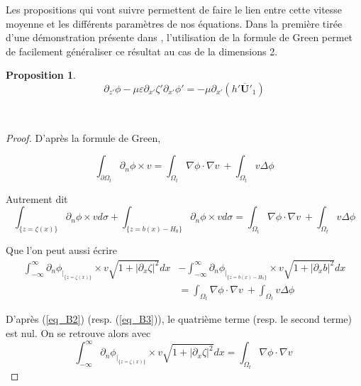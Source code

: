 \documentclass[12pt,a4paper]{article}
\newtheorem{prop}[dfn]{\textbf{Proposition}}
\numberwithin{equation}{section}
\begin{document}
Les propositions qui vont suivre permettent de faire le lien entre cette vitesse moyenne et les différents paramètres de nos équations. Dans la première tirée d'une démonstration présente dans \cite{Lannes}, l'utilisation de la formule de Green permet de facilement généraliser ce résultat au cas de la dimensions 2.
\begin{prop} \label{prop:meanspeed_to_eq4}
    $$\partial_{z'}\phi - \mu\varepsilon\partial_{x'}\zeta'\partial_{x'}\phi' = -\mu \partial_{x'}\left(h'\overline{\textbf{U}}'_1 \right)$$
\end{prop}
\,\\
\begin{proof}
    D'après la formule de Green, 

    \begin{equation}
        \int_{\partial\Omega_t}{\partial_n\phi \times v} = \int_{\Omega_t}{\nabla\phi \cdot \nabla v}~ + \int_{\Omega_t}{v\Delta \phi}
    \end{equation}

    Autrement dit
    \begin{equation}
        \int_{\{z = \zeta(x)\}}\partial_n\phi \times vd\sigma + \int_{\{z = b(x) - H_0\}}{\partial_n\phi \times v}d\sigma = \int_{\Omega_t}{\nabla\phi \cdot \nabla v}~+ \int_{\Omega_t}{v\Delta \phi}
    \end{equation}

    Que l'on peut aussi écrire
    \begin{equation}
    \begin{split}
        \int_{-\infty}^\infty\partial_n\phi_{|_{\{z = \zeta(x)\}}} \times v \sqrt{1+|\partial_x\zeta|^2}dx &- \int_{-\infty}^\infty\partial_n\phi_{|_{\{z = b(x)-H_0\}}} \times v \sqrt{1+|\partial_xb|^2}dx \\&= \int_{\Omega_t}{\nabla\phi \cdot \nabla v}~+ \int_{\Omega_t}{v\Delta \phi}
    \end{split}
    \end{equation}
    
    D'après (\ref{eq_B2}) (resp. (\ref{eq_B3})), le quatrième terme (resp. le second terme) est nul. On se retrouve alors avec
    \begin{equation}
        \int_{-\infty}^\infty\partial_n\phi_{|_{\{z = \zeta(x)\}}}  \times v \sqrt{1+|\partial_x\zeta|^2}dx = \int_{\Omega_t}{\nabla\phi \cdot \nabla v}~
    \end{equation}
    

\end{proof}
\end{document}
